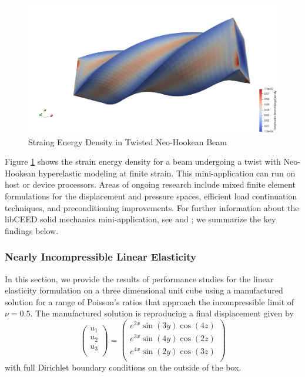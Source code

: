 \begin{figure}[ht!]
\includegraphics[width=.99\linewidth]{../img/SolidTwistExample}
\caption{Straing Energy Density in Twisted Neo-Hookean Beam}
\label{fig:solidtwist}
\end{figure}

Figure \ref{fig:solidtwist} shows the strain energy density for a beam undergoing a twist with Neo-Hookean hyperelastic modeling at finite strain.
This mini-application can run on host or device processors.
Areas of ongoing research include mixed finite element formulations for the displacement and pressure spaces, efficient load continuation techniques, and preconditioning improvements.
For further information about the libCEED solid mechanics mini-application, see \cite{imece2020} and \cite{mehraban2021simulating}; we summarize the key findings below.

\subsubsection{Nearly Incompressible Linear Elasticity}

In this section, we provide the results of performance studies for the linear elasticity formulation on a three dimensional unit cube using a manufactured solution for a range of Poisson's ratios that approach the incompressible limit of $\nu = 0.5$.
The manufactured solution is reproducing a final displacement given by
\begin{equation}
\begin{pmatrix}
u_1 \\
u_2 \\
u_3 \\
\end{pmatrix} =
\begin{pmatrix}
e^{2 x} \sin \left( 3 y \right) \cos \left( 4 z \right) \\
e^{3 x} \sin \left( 4 y \right) \cos \left( 2 z \right) \\
e^{4 x} \sin \left( 2 y \right) \cos \left( 3 z \right) \\
\end{pmatrix}
\end{equation}
with full Dirichlet boundary conditions on the outside of the box.

